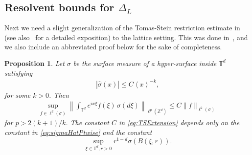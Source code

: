 \documentclass[11pt]{amsart}
\def\Z{{\mathbb{Z}}}
\def\bbT{{\mathbb{T}}}
\numberwithin{equation}{section}
\numberwithin{theorem}{section}
\newtheorem{proposition}[theorem]{Proposition}
\begin{document}
\subsection{Resolvent bounds for $\Delta_L$}
\label{sec:restriction}
Next we need a slight generalization of the Tomas-Stein restriction estimate in~\cite{tomas1975restriction} (see also~\cite[Section 11.1]{MuscaluSchlag} for a detailed exposition) to the lattice setting.  This was done in~\cite{kachkovskiui2013stein}, and we also include an abbreviated proof below for the sake of completeness.
\begin{proposition}\label{pr:decayToExtension}
Let $\sigma$ be the surface measure of a hyper-surface inside $\bbT^{d}$ satisfying
\begin{align}\label{eq:sigmaHatPtwise}
	|\hat{\sigma}(x)|\leq C\left<x \right>^{-k},
\end{align}
for some $k>0$. Then
\begin{align}\label{eq:TSExtension}
\sup_{f\in\ell^2(\sigma)}\left\|\int_{\bbT^{d}}e^{ix\xi}f(\xi)\,\sigma(d\xi)\right\|_{\ell^p(\Z^{d})}\leq C\|f\|_{\ell^2(\sigma)}
\end{align}
for $p>2(k+1)/k$.
The constant $C$ in \eqref{eq:TSExtension} depends only on the constant in \eqref{eq:sigmaHatPtwise} and the constant
\begin{equation}
\label{eq:ballgrowth}
\sup_{\xi\in\bbT^d, r>0}r^{1-d}\sigma(B(\xi,r)).
\end{equation}
\end{proposition}
\end{document}
